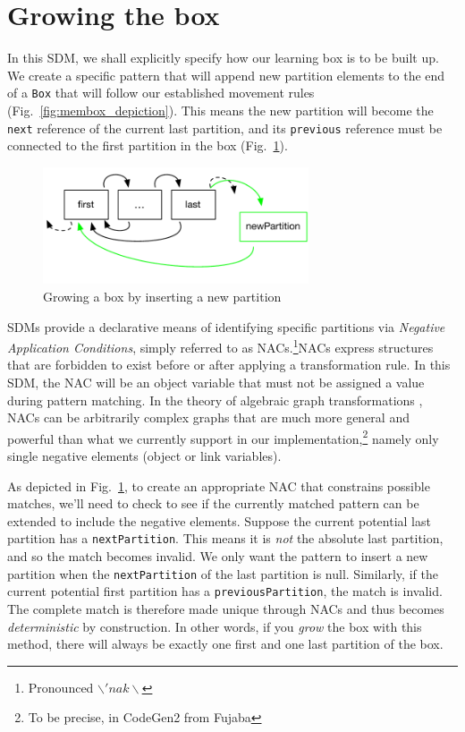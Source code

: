 \newpage
\section{Growing the box}
\genHeader

In this SDM, we shall explicitly specify how our learning box is to be built up. We create a specific pattern that will append new partition elements to the end
of a \texttt{Box} that will follow our established movement rules (Fig.~\ref{fig:membox_depiction}). This means the new partition will become the \texttt{next}
reference of the current last partition, and its \texttt{previous} reference must be connected to the first partition in the box (Fig.~\ref{fig:goal_grow}).

\begin{figure}[htbp]
 	\centering
  	\includegraphics[width=0.7\textwidth]{growBoxNACGoal.pdf}
	\caption{Growing a box by inserting a new partition}
	\label{fig:goal_grow}
\end{figure}
\FloatBarrier

SDMs provide a declarative means of identifying specific partitions via \emph{Negative Application Conditions}, simply referred to as
\mbox{NAC}s.\footnote{Pronounced $\backslash 'nak \backslash$}\mbox{NAC}s express structures that are forbidden to exist before or after applying a
transformation rule. In this SDM, the \mbox{NAC} will be an object variable that must not be assigned a value during pattern matching. In the theory of
algebraic graph transformations \cite{EEPT06}, \mbox{NACs} can be arbitrarily complex graphs that are much more general and powerful than what we currently
support in our implementation,\footnote{To be precise, in CodeGen2 from Fujaba} namely only single negative elements (object or link variables).

As depicted in Fig.~\ref{fig:goal_grow}, to create an appropriate \mbox{NAC} that constrains possible matches, we'll need to check to see if the currently
matched pattern can be extended to include the negative elements. Suppose the current potential last partition has a \texttt{nextPartition}. This means it
is \emph{not} the absolute last partition, and so the match becomes invalid. We only want the pattern to insert a new partition when the \texttt{nextPartition}
of the last partition is null. Similarly, if the current potential first partition has a \texttt{previousPartition}, the match is invalid. The complete match is
therefore made unique through NACs and thus becomes \emph{deterministic} by construction. In other words, if you \emph{grow} the box with this method, there
will always be exactly one first and one last partition of the box.

